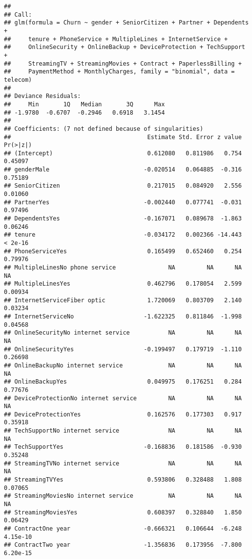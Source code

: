 \documentclass[]{article}
\begin{document}
\begin{verbatim}
## 
## Call:
## glm(formula = Churn ~ gender + SeniorCitizen + Partner + Dependents + 
##     tenure + PhoneService + MultipleLines + InternetService + 
##     OnlineSecurity + OnlineBackup + DeviceProtection + TechSupport + 
##     StreamingTV + StreamingMovies + Contract + PaperlessBilling + 
##     PaymentMethod + MonthlyCharges, family = "binomial", data = telecom)
## 
## Deviance Residuals: 
##     Min       1Q   Median       3Q      Max  
## -1.9780  -0.6707  -0.2946   0.6918   3.1454  
## 
## Coefficients: (7 not defined because of singularities)
##                                       Estimate Std. Error z value Pr(>|z|)
## (Intercept)                           0.612080   0.811986   0.754  0.45097
## genderMale                           -0.020514   0.064885  -0.316  0.75189
## SeniorCitizen                         0.217015   0.084920   2.556  0.01060
## PartnerYes                           -0.002440   0.077741  -0.031  0.97496
## DependentsYes                        -0.167071   0.089678  -1.863  0.06246
## tenure                               -0.034172   0.002366 -14.443  < 2e-16
## PhoneServiceYes                       0.165499   0.652460   0.254  0.79976
## MultipleLinesNo phone service               NA         NA      NA       NA
## MultipleLinesYes                      0.462796   0.178054   2.599  0.00934
## InternetServiceFiber optic            1.720069   0.803709   2.140  0.03234
## InternetServiceNo                    -1.622325   0.811846  -1.998  0.04568
## OnlineSecurityNo internet service           NA         NA      NA       NA
## OnlineSecurityYes                    -0.199497   0.179719  -1.110  0.26698
## OnlineBackupNo internet service             NA         NA      NA       NA
## OnlineBackupYes                       0.049975   0.176251   0.284  0.77676
## DeviceProtectionNo internet service         NA         NA      NA       NA
## DeviceProtectionYes                   0.162576   0.177303   0.917  0.35918
## TechSupportNo internet service              NA         NA      NA       NA
## TechSupportYes                       -0.168836   0.181586  -0.930  0.35248
## StreamingTVNo internet service              NA         NA      NA       NA
## StreamingTVYes                        0.593806   0.328488   1.808  0.07065
## StreamingMoviesNo internet service          NA         NA      NA       NA
## StreamingMoviesYes                    0.608397   0.328840   1.850  0.06429
## ContractOne year                     -0.666321   0.106644  -6.248 4.15e-10
## ContractTwo year                     -1.356836   0.173956  -7.800 6.20e-15

\end{verbatim}
\end{document}

